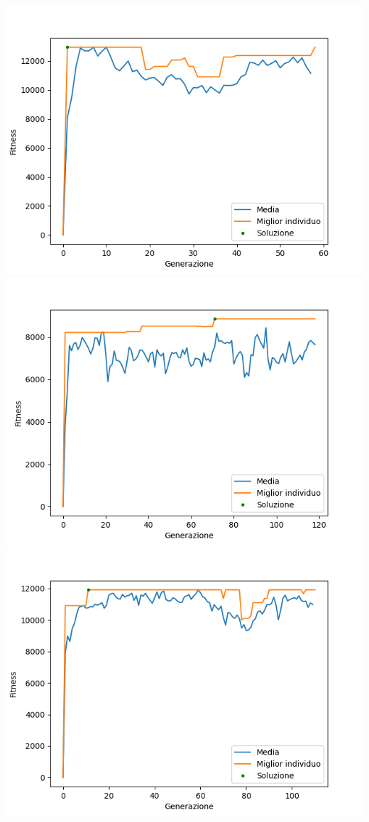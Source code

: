 \documentclass{CSUniSchoolLabReport}
\begin{document}
\begin{center}
	\includegraphics[scale=0.25]{results/9}
	\includegraphics[scale=0.25]{results/10}
	\includegraphics[scale=0.25]{results/11}

\end{center}
\end{document}
